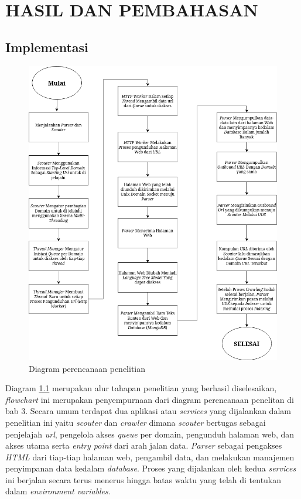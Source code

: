 
\chapter{HASIL DAN PEMBAHASAN}

\section{Implementasi}

\begin{figure}[H]
  \centering
  \includegraphics[keepaspectratio, width=12cm]{gambar/flowchart-penelitian.png}
  \caption{Diagram perencanaan penelitian}
  \label{gambar:flowchart_experiment}
\end{figure}

Diagram \ref{gambar:flowchart_experiment} merupakan alur tahapan penelitian yang berhasil diselesaikan, \emph{flowchart} ini merupakan penyempurnaan dari diagram perencanaan penelitan di bab 3. Secara umum terdapat dua aplikasi atau \emph{services} yang dijalankan dalam penelitian ini yaitu \emph{scouter} dan \emph{crawler} dimana \emph{scouter} bertugas sebagai penjelajah \emph{url}, pengelola akses \emph{queue} per domain, pengunduh halaman web, dan akses utama serta \emph{entry point} dari arah jalan data. \emph{Parser} sebagai pengakses \emph{HTML} dari tiap-tiap halaman web, pengambil data, dan melakukan manajemen penyimpanan data kedalam \emph{database}. Proses yang dijalankan oleh kedua \emph{services} ini berjalan secara terus menerus hingga batas waktu yang telah di tentukan dalam \emph{environment variables}.

